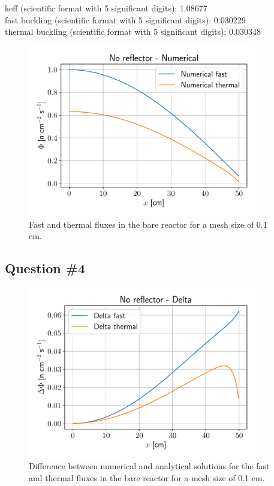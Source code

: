\documentclass[11pt,a4paper]{article}
\begin{document}
keff (scientific format with 5 significant digits): 1.08677 \\

fast buckling (scientific format with 5 significant digits): 0.030229 \\

thermal buckling (scientific format with 5 significant digits): 0.030348 \\

\begin{figure}[H]
	\includegraphics[width=10cm]{fig/Ex3_BarePhi.pdf}
	\centering
	\caption{Fast and thermal fluxes in the bare reactor for a mesh size of 0.1 cm.}
\end{figure}

\subsection{Question \#4}
\begin{figure}[H]
	\includegraphics[width=10cm]{fig/Ex3_BareDelta.pdf}
	\centering
	\caption{Difference between numerical and analytical solutions for the fast and thermal fluxes in the bare reactor for a mesh size of 0.1 cm.}
\end{figure}
\end{document}
